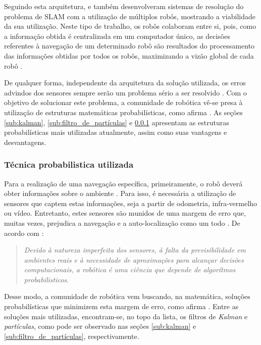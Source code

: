 			Seguindo esta arquitetura, \cite{neuralNetwork} e \cite{multiRobots} também desenvolveram sistemas de resolução do problema de SLAM com a utilização de múltiplos robôs, mostrando a viabilidade da sua utilização. Neste tipo de trabalho, os robôs colaboram entre si, pois, como a informação obtida é centralizada em um computador único, as decisões referentes à navegação de um determinado robô são resultados do processamento das informações obtidas por todos os robôs, maximizando a vizão global de cada robô \cite{redeComunicacaoIndustria}.

			De qualquer forma, independente da arquitetura da solução utilizada, os erros advindos dos sensores sempre serão um problema sério a ser resolvido \cite{circumventingAssociationSLAM}. Com o objetivo de solucionar este problema, a comunidade de robótica vê-se presa à utilização de estruturas matemáticas probabilísticas, como afirma \cite{circumventingAssociationSLAM}. As seções \ref{sub:kalman}, \ref{sub:filtro_de_partículas} e \ref{sub:prob_usada} apresentam as estruturas probabilísticas mais utilizadas atualmente, assim como suas vantagens e desvantagens.

		\subsubsection{Técnica probabilistica utilizada}
		\label{sub:prob_usada}

			Para a realização de uma navegação específica, primeiramente, o robô deverá obter informações sobre o ambiente \cite{roboticaIndustrial}. Para isso, é necessária a utilização de sensores que captem estas informações, seja a partir de odometria, infra-vermelho ou vídeo. Entretanto, estes sensores são munidos de uma margem de erro que, muitas vezes, prejudica a navegação e a auto-localização como um todo \cite{interacaoRoboAmbiente}. De acordo com \cite{circumventingAssociationSLAM}:

			\begin{quote}
				\textit{Devido à natureza imperfeita dos sensores, à falta da previsibilidade em ambientes reais e à necessidade de aproximações para alcançar decisões computacionais, a robótica é uma ciência que depende de algorítmos probabilisticos}.
			\end{quote}

			Desse modo, a comunidade de robótica vem buscando, na matemática, soluções probabilísticas que minimizem esta margem de erro, como afirma \cite{surveyLocalization}. Entre as soluções mais utilizadas, encontram-se, no topo da lista, os filtros de \textit{Kalman} e \textit{partículas}, como pode ser observado nas seções \ref{sub:kalman} e \ref{sub:filtro_de_partículas}, respectivamente.

